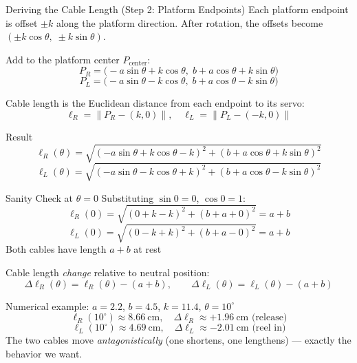\documentclass[10pt]{beamer}
\begin{document}
\begin{frame}{Deriving the Cable Length (Step 2: Platform Endpoints)}
  Each platform endpoint is offset $\pm k$ along the platform direction. After rotation, the offsets become $(\pm k\cos\theta,\; \pm k\sin\theta)$.

  Add to the platform center $P_{\text{center}}$:
  \[
    P_R = \bigl(-a\sin\theta + k\cos\theta,\; b + a\cos\theta + k\sin\theta\bigr)
  \]
  \[
    P_L = \bigl(-a\sin\theta - k\cos\theta,\; b + a\cos\theta - k\sin\theta\bigr)
  \]

  Cable length is the Euclidean distance from each endpoint to its servo:
  \[
    \ell_R = \|P_R - (k, 0)\|, \quad \ell_L = \|P_L - (-k, 0)\|
  \]

  \begin{block}{Result}
    \footnotesize
    \[
      \ell_R(\theta) = \sqrt{(-a\sin\theta + k\cos\theta - k)^2 + (b + a\cos\theta + k\sin\theta)^2}
    \]
    \[
      \ell_L(\theta) = \sqrt{(-a\sin\theta - k\cos\theta + k)^2 + (b + a\cos\theta - k\sin\theta)^2}
    \]
  \end{block}
\end{frame}

\begin{frame}{Sanity Check at $\theta = 0$}
  Substituting $\sin 0 = 0$, $\cos 0 = 1$:
  \[
    \ell_R(0) = \sqrt{(0 + k - k)^2 + (b + a + 0)^2} = a + b
  \]
  \[
    \ell_L(0) = \sqrt{(0 - k + k)^2 + (b + a - 0)^2} = a + b
  \]
  Both cables have length $a + b$ at rest \checkmark

  \medskip
  Cable length \emph{change} relative to neutral position:
  \[
    \Delta\ell_R(\theta) = \ell_R(\theta) - (a + b),
    \qquad
    \Delta\ell_L(\theta) = \ell_L(\theta) - (a + b)
  \]

  \begin{block}{Numerical example: $a=2.2$, $b=4.5$, $k=11.4$, $\theta=10^\circ$}
    \footnotesize
    \[
      \ell_R(10^\circ) \approx 8.66\ \text{cm},
      \quad \Delta\ell_R \approx +1.96\ \text{cm} \text{ (release)}
    \]
    \[
      \ell_L(10^\circ) \approx 4.69\ \text{cm},
      \quad \Delta\ell_L \approx -2.01\ \text{cm} \text{ (reel in)}
    \]
    The two cables move \emph{antagonistically} (one shortens, one lengthens) — exactly the behavior we want.
  \end{block}
\end{frame}
\end{document}
